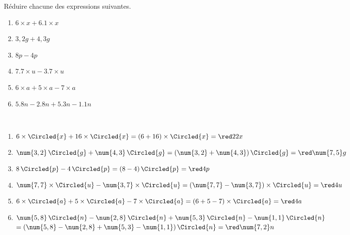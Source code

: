 \begin{exercice*} %
   Réduire chacune des expressions suivantes.
   \begin{enumerate}
      \item $6\times x+\num{6,1}\times x$
      \item $3,2g+4,3g$
      \item $8p-4p$
      \item $\num{7,7}\times u-\num{3,7}\times u$
      \item $6\times a+5\times a-7\times a$
      \item $\num{5,8}n-\num{2,8}n+\num{5,3}n-\num{1,1}n$ 
   \end{enumerate}
\end{exercice*}

\begin{corrige}
   \ \\ [-5mm]
   \begin{enumerate}
      \item $6\times\Circled{x}+16\times\Circled{x} =(6+16)\times\Circled{x} =\red 22x$
      \item $\num{3,2}\,\Circled{g}+\num{4,3}\,\Circled{g} =(\num{3,2}+\num{4,3})\,\Circled{g} =\red \num{7,5}g$
      \item $8\,\Circled{p}-4\,\Circled{p} =(8-4)\,\Circled{p} =\red 4p$
      \item $\num{7,7}\times\Circled{u}-\num{3,7}\times\Circled{u} =(\num{7,7}-\num{3,7})\times\Circled{u} =\red 4u$
      \item $6\times\Circled{a}+5\times\Circled{a}-7\times\Circled{a} =(6+5-7)\times\Circled{a} =\red 4a$
      \item $\num{5,8}\,\Circled{n}-\num{2,8}\,\Circled{n}+\num{5,3}\,\Circled{n}-\num{1,1}\,\Circled{n}$ \\
         \qquad $=(\num{5,8}-\num{2,8}+\num{5,3}-\num{1,1})\,\Circled{n} =\red \num{7,2}n$
   \end{enumerate}
\end{corrige}
